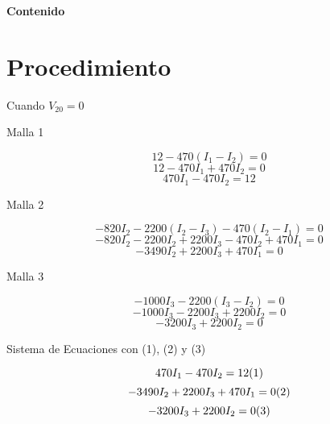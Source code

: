 \documentclass[a4paper, 11pt]{article}
\begin{document}
\textbf{}
\newpage

\begin{flushright}
\textbf{\Huge Contenido}
\end{flushright}

\renewcommand*\contentsname{}
{%
\tableofcontents
}



\newpage

\section{Procedimiento}

Cuando $V_{20}=0$

Malla 1

\begin{equation*}
12-470(I_1-I_2)=0
\end{equation*}
\begin{equation*}
12-470I_1+470I_2=0
\end{equation*}
\begin{equation*}
470I_1-470I_2=12
\end{equation*}

Malla 2

\begin{equation*}
-820I_2-2200(I_2-I_3)-470(I_2-I_1)=0 
\end{equation*}
\begin{equation*}
-820I_2-2200I_2+2200I_3-470I_2+470I_1=0 
\end{equation*}
\begin{equation*}
-3490I_2+2200I_3+470I_1=0
\end{equation*}

Malla 3

\begin{equation*}
-1000I_3-2200(I_3-I_2)=0 
\end{equation*}
\begin{equation*}
-1000I_3-2200I_3+2200I_2=0
\end{equation*}
\begin{equation*}
-3200I_3+2200I_2=0
\end{equation*}

Sistema de Ecuaciones con (1),  (2) y (3)

\begin{equation*}
470I_1-470I_2=12 \\
(1)
\end{equation*}
\begin{equation*}
-3490I_2+2200I_3+470I_1=0 \\
(2)
\end{equation*}
\begin{equation*}
-3200I_3+2200I_2=0 \\
(3)
\end{equation*}
\end{document}
